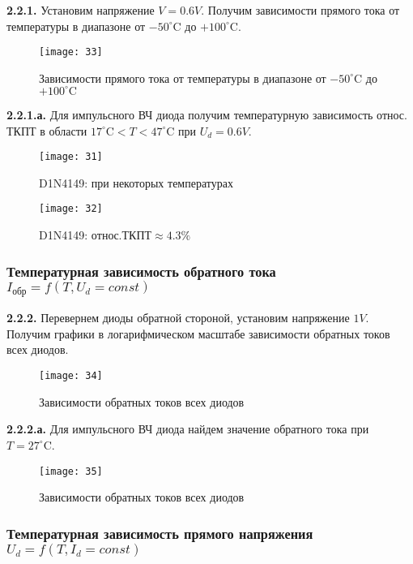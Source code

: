\documentclass{semi}
\newcommand{\Cd}{^{\circ}\mathrm{C}}
\begin{document}
\textbf{{\normalsize 2.2.1.}}
Установим напряжение $ V = 0.6V $. Получим зависимости прямого тока от температуры в диапазоне от $ -50 \Cd $ до $ +100 \Cd $.
\begin{figure}[H]
	\centering
	\texttt{[image: 33]}
	\caption{Зависимости прямого тока от температуры в диапазоне от $ -50 \Cd $ до $ +100 \Cd $}
	\label{2.2.1}
\end{figure}

\textbf{{\normalsize 2.2.1.а.}}
Для импульсного ВЧ диода получим температурную зависимость относ. ТКПТ в области $ 17 \Cd < T < 47 \Cd $ при $ U_d = 0.6V $.
\begin{figure}[H]
	\centering
	\texttt{[image: 31]}
	\caption{D1N4149: при некоторых температурах}
	\label{2.2.1.1}
\end{figure}

\begin{figure}[H]
	\centering
	\texttt{[image: 32]}
	\caption{D1N4149: $ относ. ТКПТ \approx 4.3\% $}
\end{figure}

\subsubsection*{Температурная зависимость обратного тока $ I_{обр} = f(T, U_d = const) $}

\textbf{{\normalsize 2.2.2.}}
Перевернем диоды обратной стороной, установим напряжение $ 1V $. Получим графики в логарифмическом масштабе зависимости обратных токов всех диодов.
\begin{figure}[H]
	\centering
	\texttt{[image: 34]}
	\caption{Зависимости обратных токов всех диодов}
	\label{2.2.2.}
\end{figure}

\textbf{{\normalsize 2.2.2.а.}}
Для импульсного ВЧ диода найдем значение обратного тока при $ T = 27 \Cd $.
\begin{figure}[H]
	\centering
	\texttt{[image: 35]}
	\caption{Зависимости обратных токов всех диодов}
	\label{2.2.2.1.}
\end{figure}

\subsubsection*{Температурная зависимость прямого напряжения $ U_d = f(T, I_d = const) $}
\end{document}
